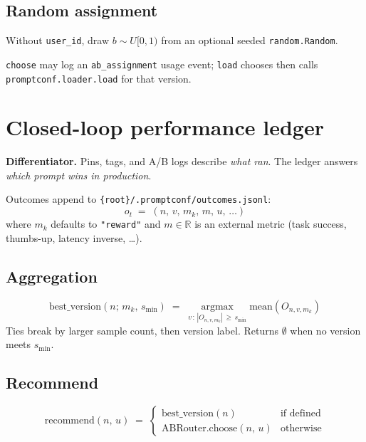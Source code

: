 \documentclass[11pt,a4paper]{article}
\newcommand{\code}[1]{\texttt{#1}}
\begin{document}
\subsection{Random assignment}

Without \code{user\_id}, draw $b \sim U[0,1)$ from an optional seeded
\code{random.Random}.

\code{choose} may log an \code{ab\_assignment} usage event; \code{load}
chooses then calls \code{promptconf.loader.load} for that version.

\section{Closed-loop performance ledger}
\label{sec:ledger}

\textbf{Differentiator.} Pins, tags, and A/B logs describe \emph{what ran}. The
ledger answers \emph{which prompt wins in production}.

Outcomes append to \code{\{root\}/.promptconf/outcomes.jsonl}:
\begin{equation}
  o_t \;=\; (n,\, v,\, m_k,\, m,\, u,\, \ldots)
\end{equation}
where $m_k$ defaults to \texttt{"reward"} and $m \in \mathbb{R}$ is an external
metric (task success, thumbs-up, latency inverse, \ldots).

\subsection{Aggregation}

\begin{equation}
  \mathrm{best\_version}(n;\, m_k,\, s_{\min}) \;=\;
  \operatorname*{argmax}_{v\,:\, |O_{n,v,m_k}| \,\ge\, s_{\min}}
  \mathrm{mean}(O_{n,v,m_k})
\end{equation}
Ties break by larger sample count, then version label. Returns $\emptyset$ when
no version meets $s_{\min}$.

\subsection{Recommend}

\begin{equation}
  \mathrm{recommend}(n,\, u) \;=\;
  \begin{cases}
    \mathrm{best\_version}(n)
      & \text{if defined} \\[0.3em]
    \mathrm{ABRouter.choose}(n,\, u)
      & \text{otherwise}
  \end{cases}
\end{equation}
\end{document}
